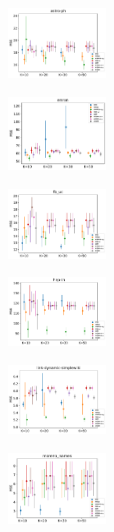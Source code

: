 
\begin{subfigure}
     \centering
         \includegraphics[width=0.23\textwidth]{fig2/astro-ph_wsim3_evo2__}
\end{subfigure}
\begin{subfigure}
         \centering
      \includegraphics[width=0.23\textwidth]{fig2/enron_wsim3_evo2__}   
\end{subfigure}  
\begin{subfigure}
         \centering          
      \includegraphics[width=0.23\textwidth]{fig2/fb_uc_wsim3_evo2__}
\end{subfigure}  
\begin{subfigure}
         \centering          
      \includegraphics[width=0.23\textwidth]{fig2/hep-th_wsim3_evo2__}
\end{subfigure}  
\begin{subfigure}
         \centering
      \includegraphics[width=0.23\textwidth]{fig2/wiki-link_wsim3_evo2__}
\end{subfigure} 
\begin{subfigure}
         \centering
      \includegraphics[width=0.23\textwidth]{fig2/moreno_names_wsim3_evo2__}
\end{subfigure} 
